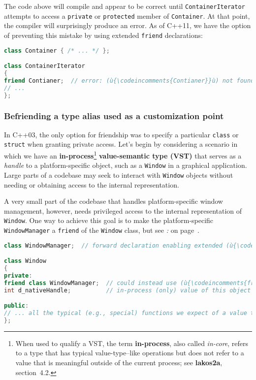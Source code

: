 \noindent The code above will compile and appear to be correct until
\texttt{ContainerIterator} attempts to access a \texttt{private} or
\texttt{protected} member of \texttt{Container}. At that point, the
compiler will surprisingly produce an error. As of C++11, we have the
option of preventing this mistake by using extended \texttt{friend}
declarations:

\begin{lstlisting}[language=C++]
class Container { /* ... */ };

class ContainerIterator
{
friend Contianer;  // error: (ù{\codeincomments{Contianer}}ù) not found
// ...
};
\end{lstlisting}


\subsubsection[Befriending a type alias used as a customization point]{Befriending a type alias used as a customization point}\label{befriending-a-type-alias-used-as-a-customization-point}

In C++03, the only option for friendship was to specify a particular
\texttt{class} or \texttt{struct} when granting private access. Let's
begin by considering a scenario in which we have an
\textbf{in-process}{\cprotect\footnote{When used to qualify a VST, the
term \textbf{in-process}, also called \emph{in-core}, refers to a type
that has typical value-type--like operations but does not refer to a
value that is meaningful outside of the current process; see
\textbf{lakos2a}, section~4.2.}} \textbf{value-semantic type (VST)}
that serves as a \emph{handle} to a platform-specific object, such as a
\texttt{Window} in a graphical application. Large parts of a codebase
may seek to interact with \texttt{Window} objects without needing or
obtaining access to the internal representation.

A very small part of the codebase that handles platform-specific window
management, however, needs privileged access to the internal
representation of \texttt{Window}. One way to achieve this goal is to
make the platform-specific \texttt{WindowManager} a \texttt{friend} of
the \texttt{Window} class, but see \textit{: } on page~\pageref{long-distance-friendship}.

\begin{lstlisting}[language=C++]
class WindowManager;  // forward declaration enabling extended (ù{\codeincomments{friend}}ù) syntax

class Window
{
private:
friend class WindowManager;  // could instead use (ù{\codeincomments{friend WindowManager;}}ù)
int d_nativeHandle;          // in-process (only) value of this object

public:
// ... all the typical (e.g., special) functions we expect of a value type
};
\end{lstlisting}

